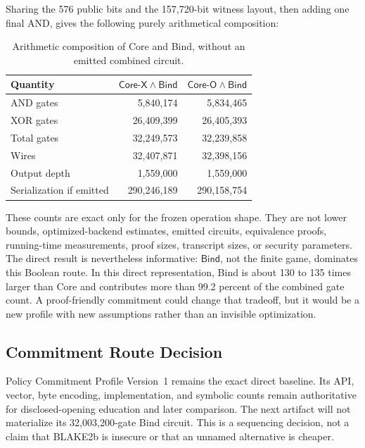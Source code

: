 Sharing the 576 public bits and the 157,720-bit witness layout, then adding one
final AND, gives the following purely arithmetical composition:

\begin{table}[htbp]
\centering
\begin{tabular}{lrr}
\hline
Quantity & \(\mathsf{Core\mbox{-}X}\land\mathsf{Bind}\)
         & \(\mathsf{Core\mbox{-}O}\land\mathsf{Bind}\) \\
\hline
AND gates & 5,840,174 & 5,834,465 \\
XOR gates & 26,409,399 & 26,405,393 \\
Total gates & 32,249,573 & 32,239,858 \\
Wires & 32,407,871 & 32,398,156 \\
Output depth & 1,559,000 & 1,559,000 \\
Serialization if emitted & 290,246,189 & 290,158,754 \\
\hline
\end{tabular}
\caption{Arithmetic composition of Core and Bind, without an emitted combined circuit.}
\label{tab:ttt-combined-cost}
\end{table}

These counts are exact only for the frozen operation shape. They are not lower
bounds, optimized-backend estimates, emitted circuits, equivalence proofs,
running-time measurements, proof sizes, transcript sizes, or security
parameters. The direct result is nevertheless informative:
\(\mathsf{Bind}\), not the finite game, dominates this Boolean route.
In this direct representation, Bind is about 130 to 135 times larger than Core
and contributes more than 99.2 percent of the combined gate count.
A proof-friendly commitment could change that tradeoff, but it would be a new
profile with new assumptions rather than an invisible optimization.

\subsection{Commitment Route Decision}

Policy Commitment Profile Version~1 remains the exact direct baseline. Its
API, vector, byte encoding, implementation, and symbolic counts remain
authoritative for disclosed-opening education and later comparison. The next
artifact will not materialize its 32,003,200-gate Bind circuit. This is a
sequencing decision, not a claim that BLAKE2b is insecure or that an unnamed
alternative is cheaper.


